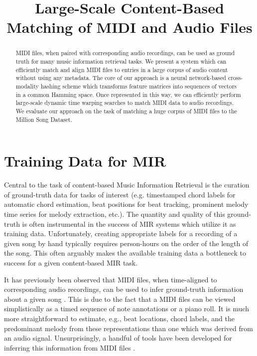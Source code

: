 \documentclass{article}
\title{Large-Scale Content-Based Matching of MIDI and Audio Files}
\begin{document}
\maketitle

\begin{abstract}
  MIDI files, when paired with corresponding audio recordings, can be used as ground truth for many music information retrieval tasks.
  We present a system which can efficiently match and align MIDI files to entries in a large corpus of audio content without using any metadata.
  The core of our approach is a neural network-based cross-modality hashing scheme which transforms feature matrices into sequences of vectors in a common Hamming space.
  Once represented in this way, we can efficiently perform large-scale dynamic time warping searches to match MIDI data to audio recordings.
  We evaluate our approach on the task of matching a huge corpus of MIDI files to the Million Song Dataset.
\end{abstract}

\section{Training Data for MIR}\label{sec:introduction}

Central to the task of content-based Music Information Retrieval is the curation of ground-truth data for tasks of interest (e.g. timestamped chord labels for automatic chord estimation, beat positions for beat tracking, prominent melody time series for melody extraction, etc.).
The quantity and quality of this ground-truth is often instrumental in the success of MIR systems which utilize it as training data.
Unfortunately, creating appropriate labels for a recording of a given song by hand typically requires person-hours on the order of the length of the song.
This often arguably makes the available training data a bottleneck to success for a given content-based MIR task.

It has previously been observed that MIDI files, when time-aligned to corresponding audio recordings, can be used to infer ground-truth information about a given song \cite{ewert2012towards, turetsky2003ground}.
This is due to the fact that a MIDI files can be viewed simplistically as a timed sequence of note annotations or a piano roll.
It is much more straightforward to estimate, e.g., beat locations, chord labels, and the predominant melody from these representations than one which was derived from an audio signal.
Unsurprisingly, a handful of tools have been developed for inferring this information from MIDI files \cite{eerola2004mir,mckay2006jsymbolic,cuthbert2010music21,raffel2014pretty_midi}.
\end{document}
